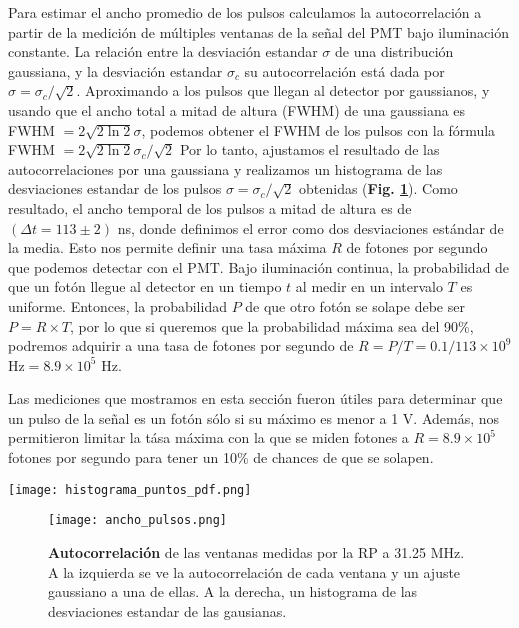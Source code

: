 Para estimar el ancho promedio de los pulsos calculamos la autocorrelación a partir de la medición de múltiples ventanas de la señal del PMT bajo iluminación constante.
La relación entre la desviación estandar $\sigma$ de una distribución gaussiana,  y la desviación estandar $\sigma_c$ su autocorrelación está dada por $\sigma = \sigma_c/\sqrt{2}$.
Aproximando a los pulsos que llegan al detector por gaussianos, y usando que el ancho total a mitad de altura (FWHM) de una gaussiana es FWHM $= 2 \sqrt{2 \ln{2}}\sigma$, podemos obtener el FWHM de los pulsos con la fórmula FWHM $= 2 \sqrt{2 \ln{2}}\sigma_c / \sqrt{2}$
Por lo tanto, ajustamos el resultado de las autocorrelaciones por una gaussiana y realizamos un histograma de las desviaciones estandar de los pulsos $\sigma = \sigma_c / \sqrt{2}$ obtenidas (\textbf{Fig. \ref{fig:ancho_pulsos}}).
Como resultado, el ancho temporal de los pulsos a mitad de altura es de $(\Delta t = 113 \pm 2)$ ns, donde definimos el error como dos desviaciones estándar de la media.
Esto nos permite definir una tasa máxima $R$ de fotones por segundo que podemos detectar con el PMT.
Bajo iluminación continua, la probabilidad de que un fotón llegue al detector en un tiempo $t$ al medir en un intervalo $T$ es uniforme.
Entonces, la probabilidad $P$ de que otro fotón se solape debe ser $P = R \times T$, por lo que si queremos que la probabilidad máxima sea del 90\%, podremos adquirir a una tasa de fotones por segundo de $R = P/T = 0.1/113 \times 10^9$ Hz$ = 8.9 \times 10^5$ Hz.

Las mediciones que mostramos en esta sección fueron útiles para determinar que un pulso de la señal es un fotón sólo si su máximo es menor a 1 V.
Además, nos permitieron limitar la tása máxima con la que se miden fotones a $R = 8.9 \times 10^5$ fotones por segundo para tener un 10\% de chances de que se solapen.

\begin{SCfigure}
    \centering
    \texttt{[image: histograma\_puntos\_pdf.png]}
    \caption{\textbf{Histograma de voltajes} de una señal del PMT tomada con la RP a 31.25 MHz. El eje vertical está en escala logarítmica.}
    \label{fig:histograma_puntos}
\end{SCfigure}


\begin{figure}
    \texttt{[image: ancho\_pulsos.png]}
    \caption{\textbf{Autocorrelación} de las ventanas medidas por la RP a 31.25 MHz. A la izquierda se ve la autocorrelación de cada ventana y un ajuste gaussiano a una de ellas. A la derecha, un histograma de las desviaciones estandar de las gausianas.}
    \label{fig:ancho_pulsos}
\end{figure}

